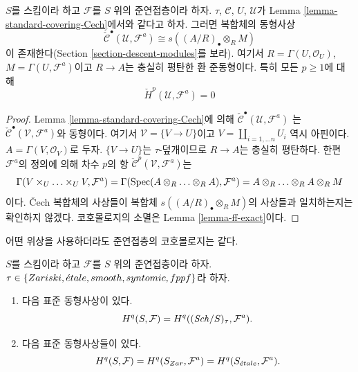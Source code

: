 \begin{lemma}
\label{lemma-standard-covering-Cech-quasi-coherent}
$S$를 스킴이라 하고 $\mathcal{F}$를 $S$ 위의 준연접층이라 하자.
$\tau$, $\mathcal{C}$, $U$, $\mathcal{U}$가 Lemma
\ref{lemma-standard-covering-Cech}에서와 같다고 하자. 그러면 복합체의
동형사상
$$
\check{\mathcal{C}}^\bullet(\mathcal{U}, \mathcal{F}^a)
\cong
s((A/R)_\bullet \otimes_R M)
$$
이 존재한다(Section \ref{section-descent-modules}를 보라). 여기서
$R = \Gamma(U, \mathcal{O}_U)$, $M = \Gamma(U, \mathcal{F}^a)$이고
$R \to A$는 충실히 평탄한 환 준동형이다. 특히 모든 $p \geq 1$에 대해
$$
\check{H}^p(\mathcal{U}, \mathcal{F}^a) = 0
$$
\end{lemma}

\begin{proof}
Lemma \ref{lemma-standard-covering-Cech}에 의해
$\check{\mathcal{C}}^\bullet(\mathcal{U}, \mathcal{F}^a)$
는 $\check{\mathcal{C}}^\bullet(\mathcal{V}, \mathcal{F}^a)$와 동형이다.
여기서 $\mathcal{V} = \{V \to U\}$이고
$V = \coprod_{i = 1, \ldots n} U_i$ 역시 아핀이다.
$A = \Gamma(V, \mathcal{O}_V)$로 두자. $\{V \to U\}$는
$\tau$-덮개이므로 $R \to A$는 충실히 평탄하다. 한편
$\mathcal{F}^a$의 정의에 의해 차수 $p$의 항
$\check{\mathcal{C}}^p(\mathcal{V}, \mathcal{F}^a)$는
$$
\Gamma(V \times_U \ldots \times_U V, \mathcal{F}^a)
=
\Gamma(\mathop{\mathrm{Spec}}(A \otimes_R \ldots \otimes_R A), \mathcal{F}^a)
=
A \otimes_R \ldots \otimes_R A \otimes_R M
$$
이다. {\v C}ech 복합체의 사상들이 복합체
$s((A/R)_\bullet \otimes_R M)$의 사상들과 일치하는지는 확인하지 않겠다.
코호몰로지의 소멸은 Lemma \ref{lemma-ff-exact}이다.
\end{proof}

\begin{proposition}
\label{proposition-same-cohomology-quasi-coherent}
\begin{slogan}
어떤 위상을 사용하더라도 준연접층의 코호몰로지는 같다.
\end{slogan}
$S$를 스킴이라 하고 $\mathcal{F}$를 $S$ 위의 준연접층이라 하자.
$\tau \in \{Zariski, \linebreak[0] \etale, \linebreak[0]
smooth, \linebreak[0] syntomic, \linebreak[0] fppf\}$라 하자.
\begin{enumerate}
\item 다음 표준 동형사상이 있다.
$$
H^q(S, \mathcal{F}) = H^q((\mathit{Sch}/S)_\tau, \mathcal{F}^a).
$$
\item 다음 표준 동형사상들이 있다.
$$
H^q(S, \mathcal{F}) =
H^q(S_{Zar}, \mathcal{F}^a) =
H^q(S_{\acute{e}tale}, \mathcal{F}^a).
$$
\end{enumerate}
\end{proposition}

